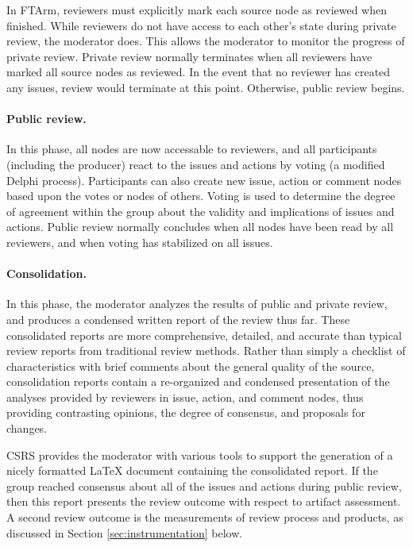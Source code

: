 In FTArm, reviewers must explicitly mark each source node as reviewed
when finished. While reviewers do not have access to each other's
state during private review, the moderator does.  This allows the
moderator to monitor the progress of private review.  Private review
normally terminates when all reviewers have marked all source nodes as
reviewed. In the event that no reviewer has created any issues, review
would terminate at this point.  Otherwise, public
review begins.

\paragraph{Public review.} In this phase, all nodes are now
accessable to reviewers, and all participants (including the producer)
react to the issues and actions by voting (a modified Delphi process).
Participants can also create new issue, action or comment nodes based upon
the votes or nodes of others.  Voting is used to determine the degree of
agreement within the group about the validity and implications of issues
and actions.  Public review normally concludes when all nodes have been read
by all reviewers, and when voting has stabilized on all issues.

\paragraph{Consolidation.} In this phase, the moderator analyzes the results of
public and private review, and produces a condensed written report of the
review thus far.  These consolidated reports are more
comprehensive, detailed, and accurate than typical review reports from
traditional review methods. Rather than simply a checklist of
characteristics with brief comments about the general quality of the
source, consolidation reports contain a re-organized and condensed
presentation of the analyses provided by reviewers in issue, action, and
comment nodes, thus providing contrasting opinions, the degree of
consensus, and proposals for changes.

CSRS provides the moderator with various tools to support the generation of
a nicely formatted LaTeX document containing the consolidated report.  If
the group reached consensus about all of the issues and actions during
public review, then this report presents the review outcome with
respect to artifact assessment.  A second review outcome is the
measurements of review process and products, as discussed in Section
\ref{sec:instrumentation} below.
 
